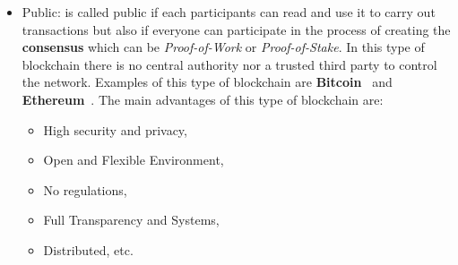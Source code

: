 \begin{itemize}
    \item {Public}: is called public if each participants can read and use it to carry out transactions but also
          if everyone can participate in the process of creating the \textbf{consensus} which can be \textit{Proof-of-Work} or \textit{Proof-of-Stake}.
          In this type of blockchain there is no central authority nor a trusted third party to control the network.
          Examples of this type of blockchain are \textbf{Bitcoin}~\cite{nakamoto2008bitcoin} and \textbf{Ethereum}~\cite{tual2015ethereum}. The main advantages of this type of blockchain are:
          \begin{itemize}
              \item High security and privacy,
              \item Open and Flexible Environment,
              \item No regulations,
              \item Full Transparency and Systems,
              \item Distributed, etc.
          \end{itemize}


\end{itemize}
